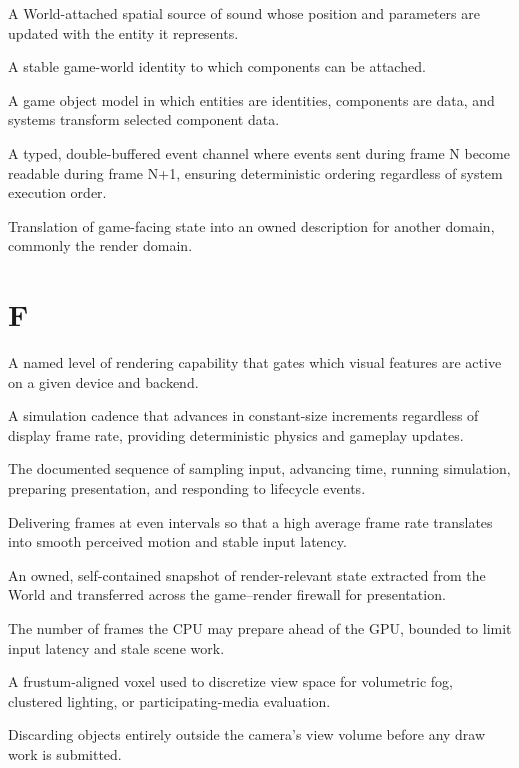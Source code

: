 \documentclass[
  11pt,
  letterpaper,
  DIV=11,
  numbers=noendperiod,
  twoside,
  open=right]{scrreprt}
\providecommand{\tightlist}{%
  \setlength{\itemsep}{0pt}\setlength{\parskip}{0pt}}
\begin{document}

\begin{description}
\tightlist
\item[\textbf{Emitter (audio)}]
A World-attached spatial source of sound whose position and parameters
are updated with the entity it represents.
\item[\textbf{Entity}]
A stable game-world identity to which components can be attached.
\item[\textbf{Entity-component system (ECS)}]
A game object model in which entities are identities, components are
data, and systems transform selected component data.
\item[\textbf{EventBus}]
A typed, double-buffered event channel where events sent during frame N
become readable during frame N+1, ensuring deterministic ordering
regardless of system execution order.
\item[\textbf{Extraction}]
Translation of game-facing state into an owned description for another
domain, commonly the render domain.
\end{description}

\section*{F}\label{f}


\begin{description}
\tightlist
\item[\textbf{Feature tier}]
A named level of rendering capability that gates which visual features
are active on a given device and backend.
\item[\textbf{Fixed timestep}]
A simulation cadence that advances in constant-size increments
regardless of display frame rate, providing deterministic physics and
gameplay updates.
\item[\textbf{Frame lifecycle}]
The documented sequence of sampling input, advancing time, running
simulation, preparing presentation, and responding to lifecycle events.
\item[\textbf{Frame pacing}]
Delivering frames at even intervals so that a high average frame rate
translates into smooth perceived motion and stable input latency.
\item[\textbf{FramePacket}]
An owned, self-contained snapshot of render-relevant state extracted
from the World and transferred across the game--render firewall for
presentation.
\item[\textbf{Frames in flight}]
The number of frames the CPU may prepare ahead of the GPU, bounded to
limit input latency and stale scene work.
\item[\textbf{Froxel}]
A frustum-aligned voxel used to discretize view space for volumetric
fog, clustered lighting, or participating-media evaluation.
\item[\textbf{Frustum culling}]
Discarding objects entirely outside the camera's view volume before any
draw work is submitted.
\end{description}
\end{document}
